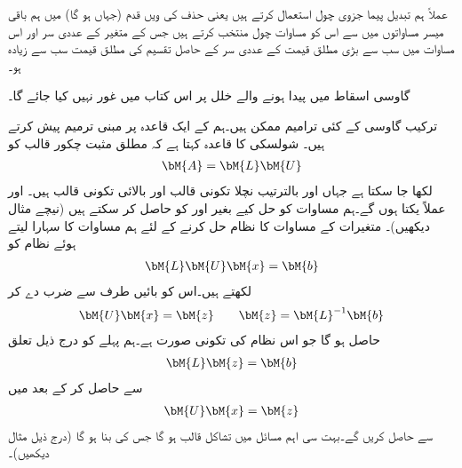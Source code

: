 عملاً ہم تبدیل پیما جزوی چول استعمال کرتے ہیں یعنی حذف کی  ویں قدم (جہاں  ہو گا) میں ہم باقی میسر  مساواتوں میں سے اس کو مساوات چول منتخب کرتے ہیں جس کے متغیر  کے عددی سر اور اس مساوات میں سب سے بڑی مطلق قیمت کے عددی سر کے حاصل تقسیم کی مطلق قیمت سب سے زیادہ ہو۔

گاوسی اسقاط میں پیدا ہونے والے خلل پر اس کتاب میں غور نہیں کیا جائے گا۔   

ترکیب گاوسی کے کئی ترامیم ممکن ہیں۔ہم  کے ایک قاعدہ پر مبنی ترمیم پیش کرتے ہیں۔ شولسکی کا قاعدہ کہتا ہے  کہ مطلق مثبت چکور قالب  کو 
\begin{align}\label{مساوات_خطی_اعدادی_شولسکی_الف}
\bM{A}=\bM{L}\bM{U}
\end{align} 
لکھا جا سکتا ہے جہاں  اور  بالترتیب نچلا تکونی قالب اور بالائی تکونی قالب ہیں۔ اور  عملاً یکتا ہوں گے۔ہم مساوات کو حل کیے بغیر  اور  کو حاصل کر سکتے ہیں (نیچے مثال دیکھیں)۔ متغیرات کے  مساوات کا نظام  حل کرنے  کے لئے ہم  مساوات  کا سہارا لیتے ہوئے  نظام کو
\begin{align*}
\bM{L}\bM{U}\bM{x}=\bM{b}
\end{align*}
لکھتے ہیں۔اس کو بائیں طرف  سے ضرب دے کر
\begin{align}\label{مساوات_خطی_اعدادی_شولسکی_ب}
\bM{U}\bM{x}=\bM{z}\quad \quad \bM{z}=\bM{L}^{-1}\bM{b}
\end{align}
حاصل ہو گا جو اس نظام کی تکونی صورت ہے۔ہم پہلے   کو درج ذیل تعلق
\begin{align}\label{مساوات_خطی_اعدادی_شولسکی_پ}
\bM{L}\bM{z}=\bM{b}
\end{align}
سے حاصل کر کے بعد میں 
\begin{align}\label{مساوات_خطی_اعدادی_شولسکی_ت}
\bM{U}\bM{x}=\bM{z}
\end{align}
سے  حاصل کریں گے۔بہت سی اہم مسائل میں  تشاکل قالب ہو گا جس کی بنا  ہو گا (درج ذیل مثال دیکھیں)۔

